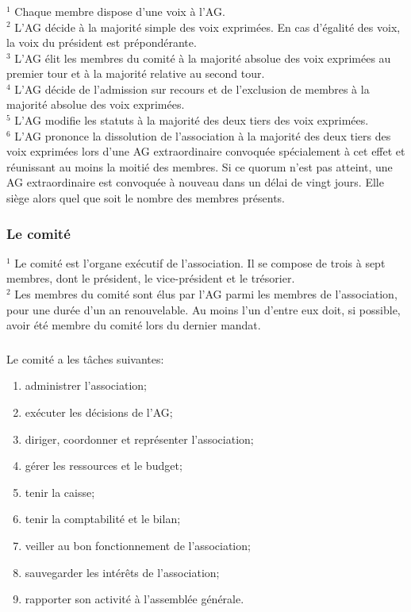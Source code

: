 \documentclass[12pt,a4paper,oneside]{article}
\newcounter{art}
\newcommand{\french}{    \switchcolumn[1]\noindent}
\newcounter{para}
\begin{document}
\begin{paracol}{2}
\french
	\subsubsection{}
	$^1$ Chaque membre dispose d’une voix à l’AG. \\
 	$^2$ L’AG décide à la majorité simple des voix exprimées. En cas d’égalité des voix, la voix du président est prépondérante. \\
	$^3$ L’AG élit les membres du comité à la majorité absolue des voix exprimées au premier tour et à la majorité relative au second tour. \\
	$^4$ L’AG décide de l’admission sur recours et de l’exclusion de membres à la majorité absolue des voix exprimées. \\
	$^5$ L’AG modifie les statuts à la majorité des deux tiers des voix exprimées. \\
	$^6$ L’AG prononce la dissolution de l’association à la majorité des deux tiers des voix exprimées lors d’une AG extraordinaire convoquée spécialement à cet effet et réunissant au moins la moitié des membres. Si ce quorum n’est pas atteint, une AG extraordinaire est convoquée à nouveau dans un délai de vingt jours. Elle siège alors quel que soit le nombre des membres présents.


\french
	\subsubsection{Le comité}
	$^1$ Le comité est l’organe exécutif de l’association. Il se compose de trois à sept membres, dont le président, le vice-président et le trésorier. \\
	$^2$ Les membres du comité sont élus par l’AG parmi les membres de l’association, pour une durée d’un an renouvelable. Au moins l’un d’entre eux doit, si possible, avoir été membre du comité lors du dernier mandat.
 

\french
	\subsubsection{}
	Le comité a les tâches suivantes:
	\begin{enumerate}[-]
		\item administrer l’association;
		\item exécuter les décisions de l’AG;
		\item diriger, coordonner et représenter l’association;
		\item gérer les ressources et le budget;
		\item tenir la caisse;
		\item tenir la comptabilité et le bilan;
		\item veiller au bon fonctionnement de l’association;
		\item sauvegarder les intérêts de l’association;
		\item rapporter son activité à l’assemblée générale.
	\end{enumerate}


\end{paracol}
\end{document}
